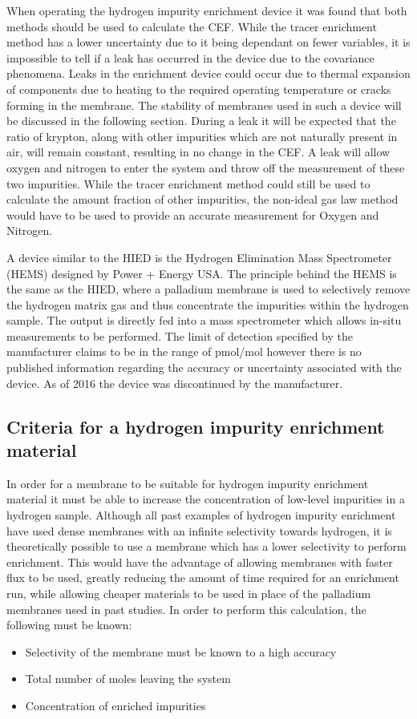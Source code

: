 When operating the hydrogen impurity enrichment device it was found that both methods should be used to 
calculate the CEF.\cite{Murugan2014}\cite{Murugan2015} While the tracer enrichment method has a lower uncertainty 
due to it being dependant on fewer variables, it is impossible to tell if a leak has occurred in the device 
due to the covariance 
phenomena. \cite{Murugan2014} Leaks in the enrichment device could occur due to thermal expansion of components due to heating 
to the required operating temperature or cracks forming in the membrane. The stability of membranes used in 
such a device will be discussed in the following section. During a leak it will be expected that the ratio of 
krypton, along with other impurities which are not naturally present in air, will remain constant, resulting 
in no change in the CEF. A leak will allow oxygen and nitrogen to enter the system and throw off the 
measurement of these two impurities. While the tracer enrichment method could still be used to calculate 
the amount fraction of other impurities, the non-ideal gas law method would have to be used to provide an 
accurate measurement for Oxygen and Nitrogen.

A device similar to the HIED is the Hydrogen Elimination Mass Spectrometer (HEMS) designed by Power + Energy USA. \cite{Bossard} 
The principle behind the HEMS is the same as the HIED, where a palladium membrane is used to selectively 
remove the hydrogen matrix gas and thus concentrate the impurities within the hydrogen sample. 
The output is directly fed into a mass spectrometer which allows in-situ measurements to be performed. 
The limit of detection specified by the manufacturer claims to be in the range of pmol/mol however there is 
no published information regarding the accuracy or uncertainty associated with the device. 
As of 2016 the device was discontinued by the manufacturer.

\subsection{Criteria for a hydrogen impurity enrichment material}
In order for a membrane to be suitable for hydrogen impurity enrichment material it must be able to 
increase the concentration of low-level impurities in a hydrogen sample. 
Although all past examples of hydrogen impurity enrichment have used dense membranes with an infinite 
selectivity towards hydrogen, it is theoretically possible to use a membrane which has a lower selectivity 
to perform enrichment. This would have the advantage of allowing membranes with faster flux to be used, 
greatly reducing the amount of time required for an enrichment run, while allowing cheaper materials to be 
used in place of the palladium membranes used in past studies. In order to perform this calculation, 
the following must be known:
\begin{itemize}
\item Selectivity of the membrane must be known to a high accuracy
\item Total number of moles leaving the system
\item Concentration of enriched impurities
\end{itemize}

